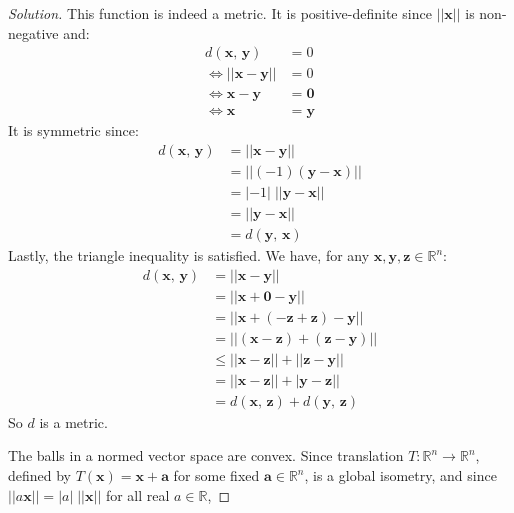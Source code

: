 \documentclass{article}
\theoremstyle{normal}
\begin{document}
    \begin{proof}[Solution]
        This function is indeed a metric. It is positive-definite since
        $||\mathbf{x}||$ is non-negative and:
        \begin{align}
            d(\mathbf{x},\,\mathbf{y})&=0\\
            \Leftrightarrow||\mathbf{x}-\mathbf{y}||&=0\\
            \Leftrightarrow\mathbf{x}-\mathbf{y}&=\mathbf{0}\\
            \Leftrightarrow\mathbf{x}&=\mathbf{y}
        \end{align}
        It is symmetric since:
        \begin{align}
            d(\mathbf{x},\,\mathbf{y})&=||\mathbf{x}-\mathbf{y}||\\
                &=||(-1)(\mathbf{y}-\mathbf{x})||\\
                &=|-1|\;||\mathbf{y}-\mathbf{x}||\\
                &=||\mathbf{y}-\mathbf{x}||\\
                &=d(\mathbf{y},\,\mathbf{x})
        \end{align}
        Lastly, the triangle inequality is satisfied. We have, for any
        $\mathbf{x},\mathbf{y},\mathbf{z}\in\mathbb{R}^{n}$:
        \begin{align}
            d(\mathbf{x},\,\mathbf{y})&=||\mathbf{x}-\mathbf{y}||\\
                &=||\mathbf{x}+\mathbf{0}-\mathbf{y}||\\
                &=||\mathbf{x}+(-\mathbf{z}+\mathbf{z})-\mathbf{y}||\\
                &=||(\mathbf{x}-\mathbf{z})+(\mathbf{z}-\mathbf{y})||\\
                &\leq||\mathbf{x}-\mathbf{z}||+||\mathbf{z}-\mathbf{y}||\\
                &=||\mathbf{x}-\mathbf{z}||+|\mathbf{y}-\mathbf{z}||\\
                &=d(\mathbf{x},\,\mathbf{z})+d(\mathbf{y},\,\mathbf{z})
        \end{align}
        So $d$ is a metric.
        \par\hfill\par
        The balls in a normed vector space are convex. Since translation
        $T:\mathbb{R}^{n}\rightarrow\mathbb{R}^{n}$, defined by
        $T(\mathbf{x})=\mathbf{x}+\mathbf{a}$ for some fixed
        $\mathbf{a}\in\mathbb{R}^{n}$, is a global isometry, and since
        $||a\mathbf{x}||=|a|\;||\mathbf{x}||$ for all real $a\in\mathbb{R}$,

\end{proof}
\end{document}
